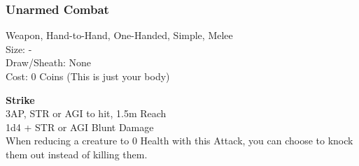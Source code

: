 \subsubsection{Unarmed Combat}\label{weapon:unarmedCombat}
Weapon, Hand-to-Hand, One-Handed, Simple, Melee\\
Size: -\\
Draw/Sheath: None\\
Cost: 0 Coins (This is just your body)

\textbf{Strike}\\
3AP, STR or AGI to hit, 1.5m Reach\\
1d4 +  STR or AGI Blunt Damage\\
When reducing a creature to 0 Health with this Attack, you can choose to knock them out instead of killing them.
